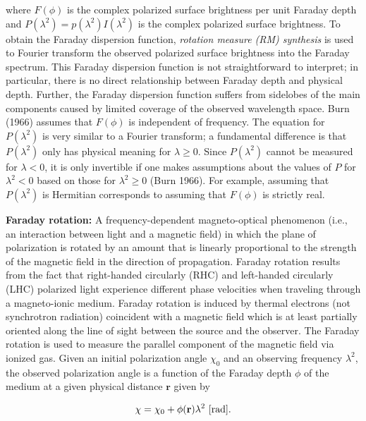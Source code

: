 \documentclass[a4paper,11pt]{article}
\begin{document}
{\noindent}where $F(\phi)$ is the complex polarized surface brightness per unit Faraday depth and $P(\lambda^2) = p(\lambda^2)I(\lambda^2)$ is the complex polarized surface brightness. To obtain the Faraday dispersion function, \textit{rotation measure (RM) synthesis} is used to Fourier transform the observed polarized surface brightness into the Faraday spectrum. This Faraday dispersion function is not straightforward to interpret; in particular, there is no direct relationship between Faraday depth and physical depth. Further, the Faraday dispersion function suffers from sidelobes of the main components caused by limited coverage of the observed wavelength space. Burn (1966) assumes that $F(\phi)$ is independent of frequency. The equation for $P(\lambda^2)$ is very similar to a Fourier transform; a fundamental difference is that $P(\lambda^2)$ only has physical meaning for $\lambda\geq0$. Since $P(\lambda^2)$ cannot be measured for $\lambda<0$, it is only invertible if one makes assumptions about the values of $P$ for $\lambda^2<0$ based on those for $\lambda^2\geq0$ (Burn 1966). For example, assuming that $P(\lambda^2)$ is Hermitian corresponds to assuming that $F(\phi)$ is strictly real.

{\noindent}\textbf{Faraday rotation:} A frequency-dependent magneto-optical phenomenon (i.e., an interaction between light and a magnetic field) in which the plane of polarization is rotated by an amount that is linearly proportional to the strength of the magnetic field in the direction of propagation. Faraday rotation results from the fact that right-handed circularly (RHC) and left-handed circularly (LHC) polarized light experience different phase velocities when traveling through a magneto-ionic medium. Faraday rotation is induced by thermal electrons (not synchrotron radiation) coincident with a magnetic field which is at least partially oriented along the line of sight between the source and the observer. The Faraday rotation is used to measure the parallel component of the magnetic field via ionized gas. Given an initial polarization angle $\chi_0$ and an observing frequency $\lambda^2$, the observed polarization angle is a function of the Faraday depth $\phi$ of the medium at a given physical distance $\mathbf{r}$ given by

\begin{align*}
    \chi = \chi_0 + \phi(\mathbf{r}) \lambda^2 ~[{\rm rad}].
\end{align*}
\end{document}
